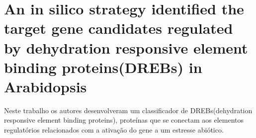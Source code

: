 \section{An in silico strategy identified the target gene candidates regulated by dehydration responsive element binding proteins(DREBs) in Arabidopsis}

Neste trabalho os autores desenvolveram um classificador de DREBs(dehydration responsive element binding proteins), proteínas que se conectam aos elementos regulatórios relacionados com a ativação do gene a um estresse abiótico. 
